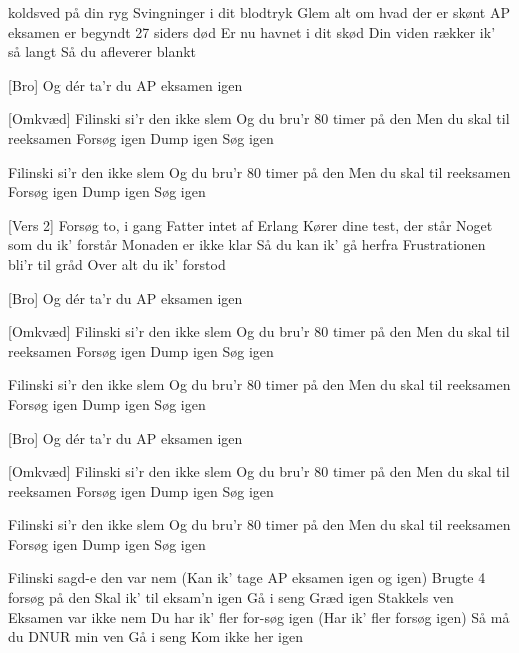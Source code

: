 \documentclass{article}
\begin{document}
 \begin{song}
[Vers 1] 
 koldsved på din ryg
Svingninger i dit blodtryk
Glem alt om hvad der er skønt
AP eksamen er begyndt
27 siders død
Er nu havnet i dit skød
Din viden rækker ik’ så langt
Så du afleverer blankt

[Bro]
 Og dér ta’r du AP eksamen igen

[Omkvæd]
 Filinski si’r den ikke slem
Og du bru’r 80 timer på den
Men du skal til reeksamen
Forsøg igen
Dump igen
Søg igen

 Filinski si’r den ikke slem
Og du bru’r 80 timer på den
Men du skal til reeksamen
Forsøg igen
Dump igen
Søg igen

[Vers 2]
 Forsøg to, i gang
Fatter intet af Erlang 
Kører dine test, der står
Noget som du ik’ forstår
Monaden er ikke klar
Så du kan ik’ gå herfra
Frustrationen bli’r til gråd
Over alt du ik’ forstod

[Bro]
 Og dér ta’r du AP eksamen igen

[Omkvæd]
 Filinski si’r den ikke slem
Og du bru’r 80 timer på den
Men du skal til reeksamen
Forsøg igen
Dump igen
Søg igen

 Filinski si’r den ikke slem
Og du bru’r 80 timer på den
Men du skal til reeksamen
Forsøg igen
Dump igen
Søg igen

[Bro]
 Og dér ta’r du AP eksamen igen

[Omkvæd]
 Filinski si’r den ikke slem
Og du bru’r 80 timer på den
Men du skal til reeksamen
Forsøg igen
Dump igen
Søg igen

 Filinski si’r den ikke slem
Og du bru’r 80 timer på den
Men du skal til reeksamen
Forsøg igen
Dump igen
Søg igen

 Filinski  sagd-e den var nem
 (Kan ik’ tage AP eksamen igen og igen)
 Brugte 4 forsøg på den
Skal ik’ til eksam’n igen
Gå i seng
Græd igen
Stakkels ven
Eksamen var ikke nem
Du har ik’ fler for-søg igen
 (Har ik’ fler forsøg igen)
 Så må du DNUR min ven
Gå i seng
Kom ikke
her igen



\end{song}
\end{document}
